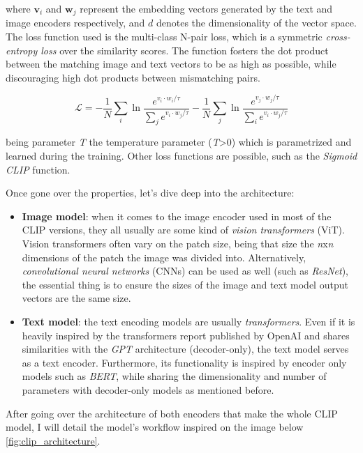 where $\mathbf{v}_i$ and $\mathbf{w}_j$ represent the embedding vectors generated by the text and image encoders respectively, and $d$ denotes the dimensionality of the vector space. The loss function used is the multi-class N-pair loss, which is a symmetric \textit{cross-entropy loss} over the similarity scores. The function fosters the dot product between the matching image and text vectors to be as high as possible, while discouraging high dot products between mismatching pairs. 

\begin{equation}
	\mathcal{L} = -\frac{1}{N} \sum_{i} \ln \frac{e^{v_i \cdot w_i / \tau}}{\sum_{j} e^{v_i \cdot w_j / \tau}} - \frac{1}{N} \sum_{j} \ln \frac{e^{v_j \cdot w_j / \tau}}{\sum_{i} e^{v_i \cdot w_j / \tau}}
\end{equation}

being parameter \textit{T} the temperature parameter (\textit{T}>0) which is parametrized and learned during the training. Other loss functions are possible, such as the \textit{Sigmoid CLIP} function.

Once gone over the properties, let's dive deep into the architecture:

\begin{itemize}
	\item \textbf{Image model}: when it comes to the image encoder used in most of the CLIP versions, they all usually are some kind of \textit{vision transformers} (ViT). Vision transformers often vary on the patch size, being that size the \textit{n}x\textit{n} dimensions of the patch the image was divided into. Alternatively, \textit{convolutional neural networks} (CNNs) can be used as well (such as \textit{ResNet}), the essential thing is to ensure the sizes of the image and text model output vectors are the same size. 
	
	\item  \textbf{Text model}: the text encoding models are usually \textit{transformers}. Even if it is heavily inspired by the transformers report published by OpenAI \cite{radford2021learningtransferablevisualmodels} and shares similarities with the \textit{GPT} architecture (decoder-only), the text model serves as a text encoder. Furthermore, its functionality is inspired by encoder only models such as \textit{BERT}, while sharing the dimensionality and number of parameters with decoder-only models as mentioned before. 
\end{itemize}

After going over the architecture of both encoders that make the whole CLIP model, I will detail the model's workflow inspired on the image below \ref{fig:clip_architecture}. 

